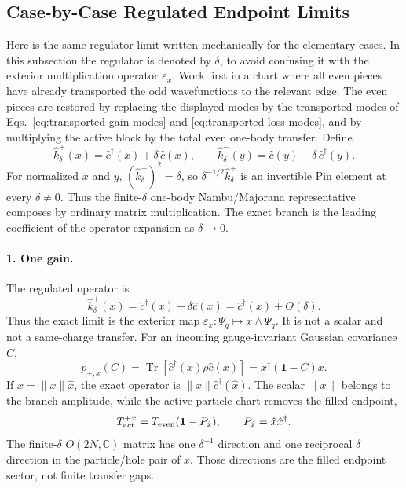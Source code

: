 \documentclass[aps,prb,onecolumn,nofootinbib,superscriptaddress]{revtex4-2}
\newcommand{\I}{\mathbf{1}}
\newcommand{\Tr}{\operatorname{Tr}}
\theoremstyle{plain}
\theoremstyle{definition}
\begin{document}
\subsection{Case-by-Case Regulated Endpoint Limits}
\label{sec:regulated-endpoint-case-derivations}

Here is the same regulator limit written mechanically for the elementary
cases.  In this subsection the regulator is denoted by \(\delta\), to avoid
confusing it with the exterior multiplication operator
\(\varepsilon_x\).  Work first in a chart where all even pieces have already
transported the odd wavefunctions to the relevant edge.  The even pieces are
restored by replacing the displayed modes by the transported modes of
Eqs.~\eqref{eq:transported-gain-modes} and
\eqref{eq:transported-loss-modes}, and by multiplying the active block by the
total even one-body transfer.  Define
\begin{equation}
  \hat k_\delta^+(x)=\hat c^\dagger(x)+\delta\,\hat c(x),
  \qquad
  \hat k_\delta^-(y)=\hat c(y)+\delta\,\hat c^\dagger(y).
  \label{eq:projectively-normalized-gain-loss}
\end{equation}
For normalized \(x\) and \(y\), \((\hat k_\delta^\pm)^2=\delta\), so
\(\delta^{-1/2}\hat k_\delta^\pm\) is an invertible Pin element at every
\(\delta\ne0\).  Thus the finite-\(\delta\) one-body Nambu/Majorana
representative composes by ordinary matrix multiplication.  The exact branch
is the leading coefficient of the operator expansion as \(\delta\to0\).

\paragraph*{1. One gain.}
The regulated operator is
\begin{equation}
  \hat k_\delta^+(x)
  =
  \hat c^\dagger(x)+\delta\hat c(x)
  =
  \hat c^\dagger(x)+O(\delta).
  \label{eq:one-gain-delta-limit}
\end{equation}
Thus the exact limit is the exterior map
\(\varepsilon_x:\Psi_q\mapsto x\wedge\Psi_q\).  It is not a scalar and not a
same-charge transfer.  For an incoming gauge-invariant Gaussian covariance
\(C\),
\begin{equation}
  p_{+,x}(C)
  =
  \Tr\!\left[\hat c^\dagger(x)\rho\hat c(x)\right]
  =
  x^\dagger(\I-C)x .
  \label{eq:one-gain-delta-born}
\end{equation}
If \(x=\|x\|\hat x\), the exact operator is
\(\|x\|\hat c^\dagger(\hat x)\).  The scalar \(\|x\|\) belongs to the branch
amplitude, while the active particle chart removes the filled endpoint,
\begin{equation}
  T_{\rm act}^{+x}
  =
  T_{\rm even}(\I-P_{\hat x}),
  \qquad
  P_{\hat x}=\hat x\hat x^\dagger .
  \label{eq:one-gain-active-transfer}
\end{equation}
The finite-\(\delta\) \(O(2N,\mathbb C)\) matrix has one
\(\delta^{-1}\) direction and one reciprocal \(\delta\) direction in the
particle/hole pair of \(x\).  Those directions are the filled endpoint
sector, not finite transfer gaps.
\end{document}
